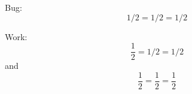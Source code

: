 \documentclass[]{article}
\begin{document}
Bug:
\begin{dmath*}
  1 / 2 = 1 / 2 = 1 / 2
\end{dmath*}

Work:
\begin{dmath*}
  \frac{1}{2} = 1 / 2 = 1 / 2
\end{dmath*}
and
\begin{dmath*}
  \frac{1}{2} = \frac{1}{2} = \frac{1}{2}
\end{dmath*}
\end{document}

